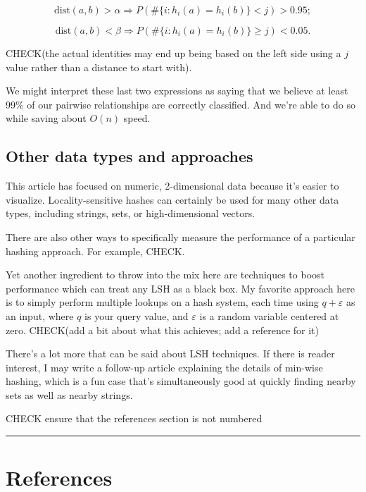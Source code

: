 \documentclass[20pt,]{extarticle}
\begin{document}
\[ \text{dist}(a, b) > \alpha \Rightarrow P(\#\{i : h_i(a) = h_i(b)\} < j) > 0.95; \]

\[ \text{dist}(a, b) < \beta  \Rightarrow P(\#\{i : h_i(a) = h_i(b)\} \ge j) < 0.05. \]

CHECK(the actual identities may end up being based on the left side
using a \(j\) value rather than a distance to start with).

We might interpret these last two expressions as saying that we believe
at least 99\% of our pairwise relationships are correctly classified.
And we're able to do so while saving about \(O(n)\) speed.

\subsection{Other data types and
approaches}\label{other-data-types-and-approaches}

This article has focused on numeric, 2-dimensional data because it's
easier to visualize. Locality-sensitive hashes can certainly be used for
many other data types, including strings, sets, or high-dimensional
vectors.

There are also other ways to specifically measure the performance of a
particular hashing approach. For example, CHECK.

Yet another ingredient to throw into the mix here are techniques to
boost performance which can treat any LSH as a black box. My favorite
approach here is to simply perform multiple lookups on a hash system,
each time using \(q + \varepsilon\) as an input, where \(q\) is your
query value, and \(\varepsilon\) is a random variable centered at zero.
CHECK(add a bit about what this achieves; add a reference for it)

There's a lot more that can be said about LSH techniques. If there is
reader interest, I may write a follow-up article explaining the details
of min-wise hashing, which is a fun case that's simultaneously good at
quickly finding nearby sets as well as nearby strings.

CHECK ensure that the references section is not numbered

\begin{center}\rule{0.5\linewidth}{\linethickness}\end{center}

\section{References}\label{references}
\end{document}
